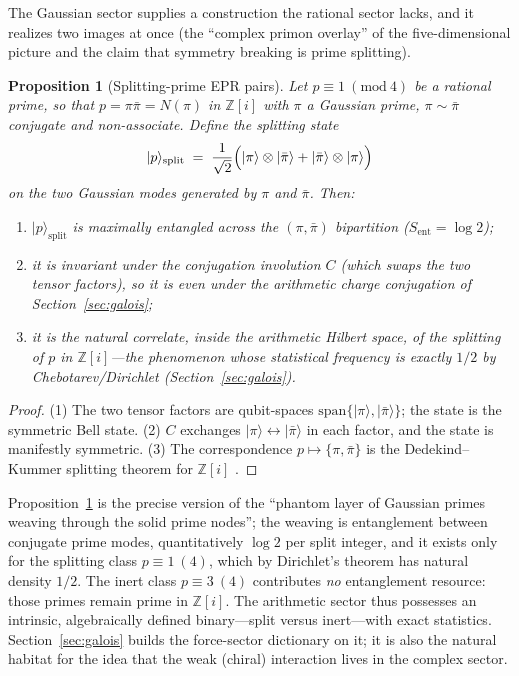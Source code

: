 \documentclass[11pt,a4paper]{article}
\theoremstyle{plain}
\newtheorem{proposition}[theorem]{Proposition}
\theoremstyle{definition}
\theoremstyle{remark}
\newcommand{\ket}[1]{\lvert #1\rangle}
\newcommand{\Zz}{\mathbb{Z}}
\begin{document}
The Gaussian sector supplies a construction the rational sector lacks, and it realizes two
images at once (the ``complex primon overlay'' of the five-dimensional
picture and the claim that symmetry breaking is prime splitting).

\begin{proposition}[Splitting-prime EPR pairs]\label{prop:splitting}
Let $p\equiv1\ (\mathrm{mod}\ 4)$ be a rational prime, so that
$p=\pi\bar\pi=N(\pi)$ in $\Zz[i]$ with $\pi$ a Gaussian prime, $\pi\sim\bar\pi$ conjugate and
non-associate. Define the \emph{splitting state}
\begin{equation}
\ket{p}_{\mathrm{split}}
\;=\;\frac{1}{\sqrt2}\Bigl(\ket{\pi}\otimes\ket{\bar\pi}
+\ket{\bar\pi}\otimes\ket{\pi}\Bigr)
\end{equation}
on the two Gaussian modes generated by $\pi$ and $\bar\pi$. Then:
\begin{enumerate}[leftmargin=1.6em]
\item $\ket{p}_{\mathrm{split}}$ is maximally entangled across the
$(\pi,\bar\pi)$ bipartition ($S_{\mathrm{ent}}=\log2$);
\item it is invariant under the conjugation involution $C$ (which swaps the two tensor
factors), so it is even under the arithmetic charge conjugation of
Section~\ref{sec:galois};
\item it is the natural correlate, inside the arithmetic Hilbert space, of the splitting of
$p$ in $\Zz[i]$---the phenomenon whose statistical frequency is exactly $1/2$ by
Chebotarev/Dirichlet (Section~\ref{sec:galois}).
\end{enumerate}
\end{proposition}

\begin{proof}
(1) The two tensor factors are qubit-spaces $\mathrm{span}\{\ket{\pi},\ket{\bar\pi}\}$; the
state is the symmetric Bell state. (2) $C$ exchanges $\ket{\pi}\leftrightarrow
\ket{\bar\pi}$ in each factor, and the state is manifestly symmetric. (3) The correspondence
$p\mapsto\{\pi,\bar\pi\}$ is the Dedekind--Kummer splitting theorem for $\Zz[i]$
\cite{neukirch1999}.
\end{proof}

Proposition~\ref{prop:splitting} is the precise version of the ``phantom layer of
Gaussian primes weaving through the solid prime nodes''; the weaving is entanglement between
conjugate prime modes, quantitatively $\log2$ per split integer, and it exists only for the
splitting class $p\equiv1\ (4)$, which by Dirichlet's theorem has natural density $1/2$. The
inert class $p\equiv3\ (4)$ contributes \emph{no} entanglement resource: those primes remain
prime in $\Zz[i]$. The arithmetic sector thus possesses an intrinsic, algebraically defined
binary---split versus inert---with exact statistics. Section~\ref{sec:galois} builds the
force-sector dictionary on it; it is also the natural habitat for the idea that the
weak (chiral) interaction lives in the complex sector.
\end{document}
